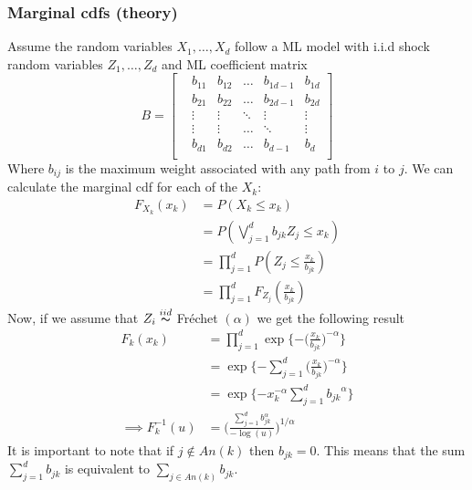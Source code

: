 \documentclass[12pt]{article}
\def\inv{^{-1}}
\newcommand{\ds}{\displaystyle}
\theoremstyle{definition}
\theoremstyle{definition}
\begin{document}
\subsubsection{Marginal cdfs (theory)}
Assume the random variables $X_1,\hdots, X_d$ follow a ML model with i.i.d shock random variables $Z_1,\hdots, Z_d$ and ML coefficient matrix 
\[ B=\begin{bmatrix}
&b_{11} &b_{12}&\hdots& b_{1d-1}& b_{1d}\\
&b_{21} &b_{22}&\hdots& b_{2d-1}& b_{2d}\\
&\vdots&\vdots&\ddots & \vdots& \vdots \\
&\vdots&\vdots&\hdots & \ddots& \vdots \\
&b_{d1}& b_{d2} & \hdots &b_{d-1}& b_{d}\\
\end{bmatrix}
\]
Where $b_{ij}$ is the maximum weight associated with any path from $i$ to $j$. We can calculate the marginal cdf for each of the $X_k$:
\begin{align*}
    F_{X_k}(x_k)&=P(X_k\leq x_k)\\
    &=P(\bigvee_{j=1}^db_{jk}Z_j\leq x_k)\\
    &=\prod_{j=1}^dP(Z_j\leq \frac{x_k}{b_{jk}})\\
    &=\prod_{j=1}^dF_{Z_j}( \frac{x_k}{b_{jk}})
\end{align*}
Now, if we assume that $Z_i\overset{iid}{\thicksim}$ Fréchet $(\alpha)$ we get the following result
\begin{align*}
    F_{k}(x_k)&=\prod_{j=1}^d\exp\bigg\{{-\big(\frac{x_k}{b_{jk}}}\big)^{-\alpha}\bigg\}\\
    &=\exp\bigg\{{-\sum_{j=1}^d\big(\frac{x_k}{b_{jk}}}\big)^{-\alpha}\bigg\}\\
    &=\exp\bigg\{{-x_k^{-\alpha}\sum_{j=1}^d{b_{jk}}^{\alpha}}\bigg\}\\
    \implies F_{k}\inv(u)&=\bigg(\frac{\sum_{j=1}^d{b_{jk}^\alpha}}{-\log(u)} \bigg)^{{1}/{\alpha}}
\end{align*}
It is important to note that if $j\notin An(k)$ then $b_{jk}=0$. This means that the sum $\ds \sum_{j=1}^d{b_{jk}}$ is equivalent to $\ds \sum_{j\in An(k)}{b_{jk}}$.
\end{document}
